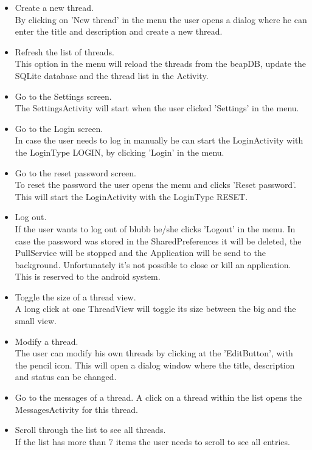 \documentclass[12pt,a4paper,oneside]{report}
\newcommand{\appname}{blubb}
\newcommand{\beapDB}{beapDB}
\begin{document}
\begin{itemize}
\item{Create a new thread.}\\
By clicking on 'New thread' in the menu the user opens a dialog where he can enter the title and description and create a new thread.

\item{Refresh the list of threads.}\\
This option in the menu will reload the threads from the \beapDB{}, update the SQLite database and the thread list in the Activity.

\item{Go to the Settings screen.}\\
The SettingsActivity will start when the user clicked 'Settings' in the menu.

\item{Go to the Login screen.}\\
In case the user needs to log in manually he can start the LoginActivity with the LoginType LOGIN, by clicking 'Login' in the menu. 

\item{Go to the reset password screen.}\\
To reset the password the user opens the menu and clicks 'Reset password'. This will start the LoginActivity with the LoginType RESET.

\item{Log out.}\\
If the user wants to log out of \appname{} he/she clicks 'Logout' in the menu. In case the password was stored in the SharedPreferences it will be deleted, the PullService will be stopped and the Application will be send to the background. Unfortunately it's not possible to close or kill an application. This is reserved to the android system.

\item{Toggle the size of  a thread view.}\\
A long click at one ThreadView will toggle its size between the big and the small view.

\item{Modify a thread.}\\
The user can modify his own threads by clicking at the 'EditButton', with the pencil icon. This will open a dialog window where the title, description and status can be changed.

\item{Go to the messages of a thread.}
A click on a thread within the list opens the MessagesActivity for this thread. 

\item{Scroll through the list to see all threads.}\\
If the list has more than 7 items the user needs to scroll to see all entries.

\end{itemize} 
\end{document}

